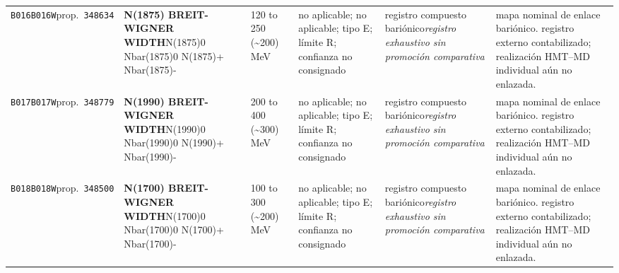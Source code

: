 \begin{landscape}
\begin{longtable}{L{1.85cm}L{4.45cm}L{2.35cm}L{4.05cm}L{3.35cm}L{7.15cm}}
\texttt{B016}\newline \texttt{B016W}\newline prop.\ \texttt{348634} & \textbf{N(1875) BREIT-WIGNER WIDTH}\newline N(1875)0 \textbar{}\allowbreak{} Nbar(1875)0 \textbar{}\allowbreak{} N(1875)+ \textbar{}\allowbreak{} Nbar(1875)- & 120 to 250 (\textasciitilde{}200)\,MeV & no aplicable; no aplicable; tipo E; límite R; confianza no consignado & registro compuesto bariónico\newline \emph{registro exhaustivo sin promoción comparativa} & mapa nominal de enlace bariónico. registro externo contabilizado; realización HMT--MD individual aún no enlazada. \\
\texttt{B017}\newline \texttt{B017W}\newline prop.\ \texttt{348779} & \textbf{N(1990) BREIT-WIGNER WIDTH}\newline N(1990)0 \textbar{}\allowbreak{} Nbar(1990)0 \textbar{}\allowbreak{} N(1990)+ \textbar{}\allowbreak{} Nbar(1990)- & 200 to 400 (\textasciitilde{}300)\,MeV & no aplicable; no aplicable; tipo E; límite R; confianza no consignado & registro compuesto bariónico\newline \emph{registro exhaustivo sin promoción comparativa} & mapa nominal de enlace bariónico. registro externo contabilizado; realización HMT--MD individual aún no enlazada. \\
\texttt{B018}\newline \texttt{B018W}\newline prop.\ \texttt{348500} & \textbf{N(1700) BREIT-WIGNER WIDTH}\newline N(1700)0 \textbar{}\allowbreak{} Nbar(1700)0 \textbar{}\allowbreak{} N(1700)+ \textbar{}\allowbreak{} Nbar(1700)- & 100 to 300 (\textasciitilde{}200)\,MeV & no aplicable; no aplicable; tipo E; límite R; confianza no consignado & registro compuesto bariónico\newline \emph{registro exhaustivo sin promoción comparativa} & mapa nominal de enlace bariónico. registro externo contabilizado; realización HMT--MD individual aún no enlazada. \\

\end{longtable}
\end{landscape}
